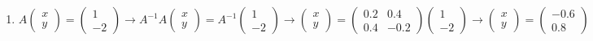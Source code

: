 \documentclass{article}
\begin{document}
\begin{enumerate}
\begin{enumerate}
\item 
$
A \left(\begin{array}{c} x \\ y \end{array} \right) = \left(\begin{array}{c} 1 \\ -2 \end{array} \right)
\rightarrow
A^{-1} A \left(\begin{array}{c} x \\ y \end{array} \right) = A^{-1} \left(\begin{array}{c} 1 \\ -2 \end{array} \right)
\rightarrow
\left(\begin{array}{c} x \\ y \end{array} \right) = \left(\begin{array}{cc} 0.2 & 0.4 \\ 0.4 & -0.2 \end{array} \right) \left(\begin{array}{c} 1 \\ -2 \end{array} \right)
\rightarrow
\left(\begin{array}{c} x \\ y \end{array} \right) =  \left(\begin{array}{c} -0.6 \\ 0.8 \end{array} \right)
$


\end{enumerate}
\end{enumerate}
\end{document}
